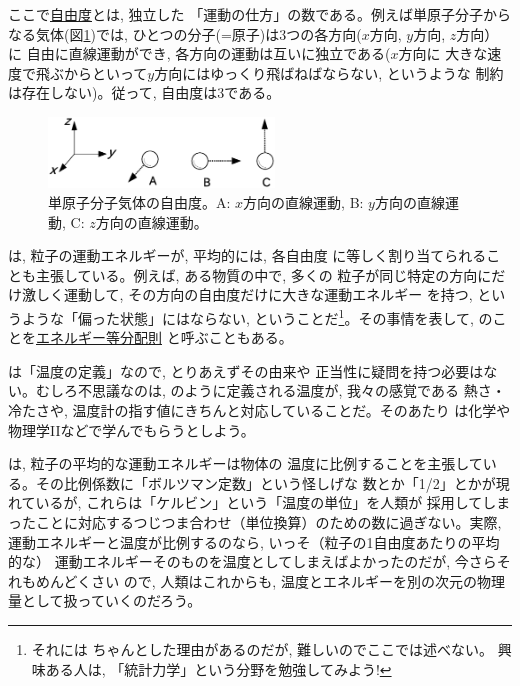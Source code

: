 ここで\underline{自由度}とは, 独立した
「運動の仕方」の数である。例えば単原子分子からなる気体(図\ref{fig:deg_freedom1})では, 
ひとつの分子(=原子)は3つの各方向($x$方向, $y$方向, $z$方向）に
自由に直線運動ができ, 各方向の運動は互いに独立である($x$方向に
大きな速度で飛ぶからといって$y$方向にはゆっくり飛ばねばならない, というような
制約は存在しない)。従って, 自由度は3である。

\begin{figure}[h]
    \centering
    \includegraphics[width=6cm]{deg_freedom1.eps}
    \caption{単原子分子気体の自由度。A: $x$方向の直線運動, B: $y$方向の直線運動, C: $z$方向の直線運動。}\label{fig:deg_freedom1}
\end{figure}

は, 粒子の運動エネルギーが, 平均的には, 各自由度
に等しく割り当てられることも主張している。例えば, ある物質の中で, 多くの
粒子が同じ特定の方向にだけ激しく運動して, その方向の自由度だけに大きな運動エネルギー
を持つ, というような「偏った状態」にはならない, ということだ\footnote{それには
ちゃんとした理由があるのだが, 難しいのでここでは述べない。
興味ある人は, 「統計力学」という分野を勉強してみよう!}。その事情を表して, 
のことを\underline{エネルギー等分配則}
と呼ぶこともある。\mv

は「温度の定義」なので, とりあえずその由来や
正当性に疑問を持つ必要はない。むしろ不思議なのは, 
のように定義される温度が, 我々の感覚である
熱さ・冷たさや, 温度計の指す値にきちんと対応していることだ。そのあたり
は化学や物理学IIなどで学んでもらうとしよう。

は, 粒子の平均的な運動エネルギーは物体の
温度に比例することを主張している。その比例係数に「ボルツマン定数」という怪しげな
数とか「1/2」とかが現れているが, これらは「ケルビン」という「温度の単位」を人類が
採用してしまったことに対応するつじつま合わせ（単位換算）のための数に過ぎない。実際, 
運動エネルギーと温度が比例するのなら, いっそ（粒子の1自由度あたりの平均的な）
運動エネルギーそのものを温度としてしまえばよかったのだが, 今さらそれもめんどくさい
ので, 人類はこれからも, 温度とエネルギーを別の次元の物理量として扱っていくのだろう。\mv

